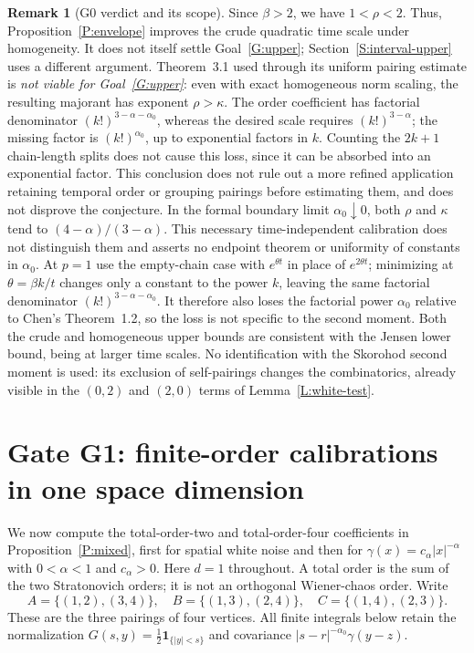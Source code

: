 \documentclass[12pt]{article}
\numberwithin{equation}{section}
\theoremstyle{definition}
\newtheorem{remark}[theorem]{Remark}
\begin{document}
\begin{remark}[G0 verdict and its scope]\label{R:G0-verdict}
  Since $\beta>2$, we have $1<\rho<2$. Thus,
  Proposition~\ref{P:envelope} improves the crude quadratic time scale
  under homogeneity. It does not itself settle Goal~\ref{G:upper};
  Section~\ref{S:interval-upper} uses a different argument.
  Theorem~3.1 used through its uniform pairing estimate is \emph{not
  viable for Goal~\ref{G:upper}}: even with exact homogeneous norm
  scaling, the resulting majorant has exponent $\rho>\kappa$.
  The order coefficient has factorial denominator $(k!)^{3-\alpha-\alpha_0}$,
  whereas the desired scale requires $(k!)^{3-\alpha}$; the missing
  factor is $(k!)^{\alpha_0}$, up to exponential factors in $k$.
  Counting the $2k+1$ chain-length splits does not cause this loss,
  since it can be absorbed into an exponential factor.
  This conclusion does not rule out a more refined application retaining
  temporal order or grouping pairings before estimating them, and does not
  disprove the conjecture. In the formal boundary limit
  $\alpha_0\downarrow0$, both $\rho$ and $\kappa$ tend to
  $(4-\alpha)/(3-\alpha)$. This necessary time-independent calibration
  does not distinguish them and asserts no endpoint theorem or uniformity
  of constants in $\alpha_0$. At $p=1$ use the empty-chain case with
  $e^{\theta t}$ in place of $e^{2\theta t}$; minimizing at
  $\theta=\beta k/t$ changes only a constant to the power $k$, leaving
  the same factorial denominator $(k!)^{3-\alpha-\alpha_0}$.
  It therefore also loses the factorial power $\alpha_0$ relative to
  Chen's Theorem~1.2, so the loss is not specific to the second moment. Both the crude and homogeneous upper bounds are
  consistent with the Jensen lower bound, being at larger time scales.
  No identification with the Skorohod second moment is used: its exclusion
  of self-pairings changes the combinatorics, already visible in the
  $(0,2)$ and $(2,0)$ terms of Lemma~\ref{L:white-test}.
\end{remark}

\section{Gate G1: finite-order calibrations in one space dimension}\label{S:G1}

We now compute the total-order-two and total-order-four coefficients in
Proposition~\ref{P:mixed}, first for spatial white noise and then for
$\gamma(x)=c_\alpha|x|^{-\alpha}$ with $0<\alpha<1$ and $c_\alpha>0$.
Here $d=1$ throughout. A total order is the sum of the two Stratonovich
orders; it is not an orthogonal Wiener-chaos order. Write
\[
  A=\{(1,2),(3,4)\},\quad B=\{(1,3),(2,4)\},\quad
  C=\{(1,4),(2,3)\}.
\]
These are the three pairings of four vertices. All finite integrals below
retain the normalization $G(s,y)=\frac12\mathbf1_{\{|y|<s\}}$ and
covariance $|s-r|^{-\alpha_0}\gamma(y-z)$.
\end{document}
